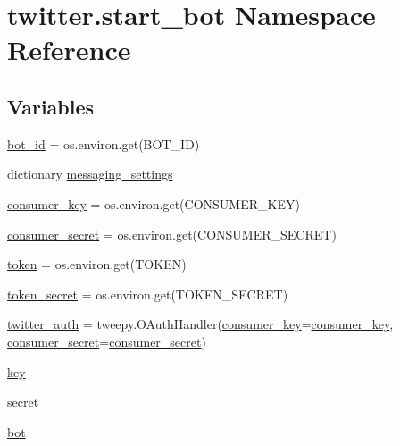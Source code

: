 \hypertarget{namespacetwitter_1_1start__bot}{}\section{twitter.\+start\+\_\+bot Namespace Reference}
\label{namespacetwitter_1_1start__bot}
\subsection*{Variables}
\begin{DoxyCompactItemize}
\item 
\hyperlink{namespacetwitter_1_1start__bot_a39c87df420e6fd56ed192fc038cea853}{bot\+\_\+id} = os.\+environ.\+get(\textquotesingle{}B\+O\+T\+\_\+\+ID\textquotesingle{})
\item 
dictionary \hyperlink{namespacetwitter_1_1start__bot_aafa8c2a48201b4089e1ff9ca970da94f}{messaging\+\_\+settings}
\item 
\hyperlink{namespacetwitter_1_1start__bot_a6ee394450a1b57a8da97f52925f8a98e}{consumer\+\_\+key} = os.\+environ.\+get(\textquotesingle{}C\+O\+N\+S\+U\+M\+E\+R\+\_\+\+K\+EY\textquotesingle{})
\item 
\hyperlink{namespacetwitter_1_1start__bot_aa6ff8a67f0b9fa5ce0aa135e6c35e40b}{consumer\+\_\+secret} = os.\+environ.\+get(\textquotesingle{}C\+O\+N\+S\+U\+M\+E\+R\+\_\+\+S\+E\+C\+R\+ET\textquotesingle{})
\item 
\hyperlink{namespacetwitter_1_1start__bot_a4cb2d1bc63d16dcded728840e60298b8}{token} = os.\+environ.\+get(\textquotesingle{}T\+O\+K\+EN\textquotesingle{})
\item 
\hyperlink{namespacetwitter_1_1start__bot_add71ef8b6bdf3cc2c132ac12699e7df0}{token\+\_\+secret} = os.\+environ.\+get(\textquotesingle{}T\+O\+K\+E\+N\+\_\+\+S\+E\+C\+R\+ET\textquotesingle{})
\item 
\hyperlink{namespacetwitter_1_1start__bot_a185f5df3f5b6e91caebbaa893db9cb29}{twitter\+\_\+auth} = tweepy.\+O\+Auth\+Handler(\hyperlink{namespacetwitter_1_1start__bot_a6ee394450a1b57a8da97f52925f8a98e}{consumer\+\_\+key}=\hyperlink{namespacetwitter_1_1start__bot_a6ee394450a1b57a8da97f52925f8a98e}{consumer\+\_\+key}, \hyperlink{namespacetwitter_1_1start__bot_aa6ff8a67f0b9fa5ce0aa135e6c35e40b}{consumer\+\_\+secret}=\hyperlink{namespacetwitter_1_1start__bot_aa6ff8a67f0b9fa5ce0aa135e6c35e40b}{consumer\+\_\+secret})
\item 
\hyperlink{namespacetwitter_1_1start__bot_a55145bbc29d72c1cfad0d8def9a015ad}{key}
\item 
\hyperlink{namespacetwitter_1_1start__bot_a4d5d5aa82b155af04ee018403ac51201}{secret}
\item 
\hyperlink{namespacetwitter_1_1start__bot_a2a483e905414b191f63295a1c4e72341}{bot}
\end{DoxyCompactItemize}


